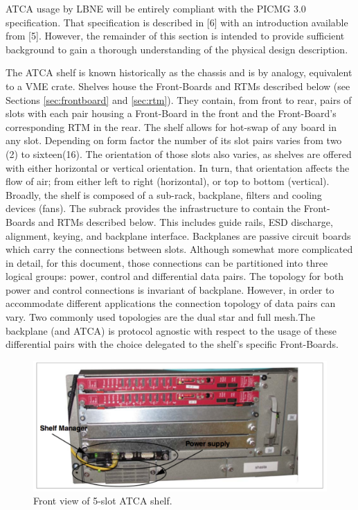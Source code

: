 ATCA usage by LBNE will be entirely compliant with the PICMG 3.0 specification. That specification is described in [6] with an introduction available from [5]. However, the remainder of this section is intended to provide sufficient background to gain a thorough understanding of the physical design description.

The ATCA shelf is known historically as the chassis and is by analogy, equivalent to a VME crate. Shelves house the Front-Boards and RTMs described below (see Sections \ref{sec:frontboard} and \ref{sec:rtm}). They contain, from front to rear, pairs of slots with each pair housing a Front-Board in the front and the Front-Board's corresponding RTM in the rear. The shelf allows for hot-swap of any board in any slot. Depending on form factor the number of its slot pairs varies from two (2) to sixteen(16). The orientation of those slots also varies, as shelves are offered with either horizontal or vertical orientation. In turn, that orientation affects the flow of air; from either left to right (horizontal), or top to bottom (vertical).
Broadly, the shelf is composed of a sub-rack, backplane, filters and cooling devices (fans). The subrack provides the infrastructure to contain the Front-Boards and RTMs described below. This includes guide rails, ESD discharge, alignment, keying, and backplane interface. Backplanes are passive circuit boards which carry the connections between slots. Although somewhat more complicated in detail, for this document, those connections can be partitioned into three logical groups: power, control and differential data pairs. The topology for both power and control connections is invariant of backplane. However, in order to accommodate different applications the connection topology of data pairs can vary. Two commonly used topologies are the dual star and full mesh.The backplane (and ATCA) is protocol agnostic with respect to the usage of these differential pairs with the choice delegated to the shelf's specific Front-Boards.

\begin{figure}[tbh]
\includegraphics[scale=0.8]{shelf-front.pdf}
\caption{Front view of 5-slot ATCA shelf.}
\label{fig:frontShelf}
\end{figure} 


